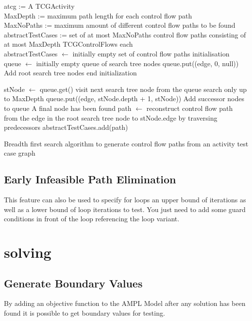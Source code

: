 \begin{algorithm}
\begin{algorithmic}
\Require atcg := A TCGActivity \\
MaxDepth := maximum path length for each control flow path \\
MaxNoPaths := maximum amount of different control flow paths to be found
\Ensure abstractTestCases := set of at most MaxNoPaths control flow paths consisting of at most MaxDepth TCGControlFlows each\\
\State abstractTestCases $\gets$ initially empty set of control flow paths \Comment initialisation
\State queue $\gets$ initially empty queue of search tree nodes
\State queue.put((edge, 0, null)) \Comment Add root search tree nodes
\EndFor \Comment end initialization

\State stNode $\gets$ queue.get() \Comment visit next search tree node from the queue
 \Comment search only up to MaxDepth
\State queue.put((edge, stNode.depth + 1, stNode)) \Comment Add successor nodes to queue
\EndFor
\EndIf
{} \Comment A final node has been found
\State path $\gets$ reconstruct control flow path from the edge in the root search tree node to stNode.edge by traversing predecessors
\State abstractTestCases.add(path) \Comment 
\EndIf
\EndWhile
\end{algorithmic}
\caption{Breadth first search algorithm to generate control flow paths from an activity test case graph}
\label{alg:BreadthFirstSearch}
\end{algorithm}
\subsection{Early Infeasible Path Elimination}
\label{sec:EarlyInfeasiblePathRecognition}
This feature can also be used to specify for loops an upper bound of iterations as well as a lower bound of loop iterations to test. You just need to add some guard conditions in front of the loop referencing the loop variant.
\section{solving}
\label{sec:testgenerationSolving}
\subsection{Generate Boundary Values}
\label{sec:boundaryValueSelection}
By adding an objective function to the AMPL Model after any solution has been found it is possible to get boundary values for testing.

